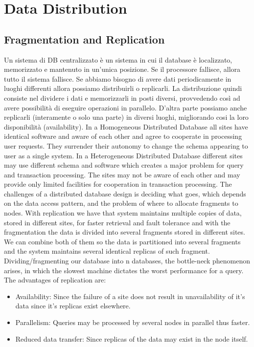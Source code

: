 \documentclass[a4page, 11pt]{article}
\begin{document}
\section{Data Distribution}
\subsection{Fragmentation and Replication}
Un sistema di DB centralizzato è un sistema in cui il database è localizzato, memorizzato e mantenuto in un'unica posizione. Se il processore fallisce, allora tutto il sistema fallisce.
Se abbiamo bisogno di avere dati periodicamente in luoghi differenti allora possiamo distribuirli o replicarli. La distribuzione quindi consiste nel dividere i dati e memorizzarli in posti diversi, provvedendo così ad avere possibilità di eseguire operazioni in parallelo. D'altra parte possiamo anche replicarli (interamente o solo una parte) in diversi luoghi, migliorando cosi la loro disponibilità (availability).
\newline
In a Homogeneous Distributed Database all sites have identical software and aware of each other and agree to cooperate in processing user requests. They surrender their autonomy to change the schema appearing to user as a single system.
\newline
In a Heterogeneous Distributed Database different sites may use different schema and software which creates a major problem for query and transaction processing. The sites may not be aware of each other and may provide only limited facilities for cooperation in transaction processing.
\newline
The challenges of a distributed database design is deciding what goes, which depends on the data access pattern, and the problem of where to allocate fragments to nodes.
With replication we have that system maintains multiple copies of data, stored in different sites, for faster retrieval and fault tolerance and with the fragmentation the data is divided into several fragments stored in different sites. We can combine both of them so the data is partitioned into several fragments and the system maintains several identical replicas of such fragment.
\newline
Dividing/fragmenting our database into n databases, the bottle-neck phenomenon arises, in which the slowest machine dictates the worst performance for a query.
\newline
The advantages of replication are:
\begin{itemize}[noitemsep]
	\item
	Availability: Since the failure of a site does not result in unavailability of it's data since it's replicas exist elsewhere.
	\item
	Parallelism: Queries may be processed by several nodes in parallel thus faster.
	\item
	Reduced data transfer: Since replicas of the data may exist in the node itself.
\end{itemize}
\end{document}
